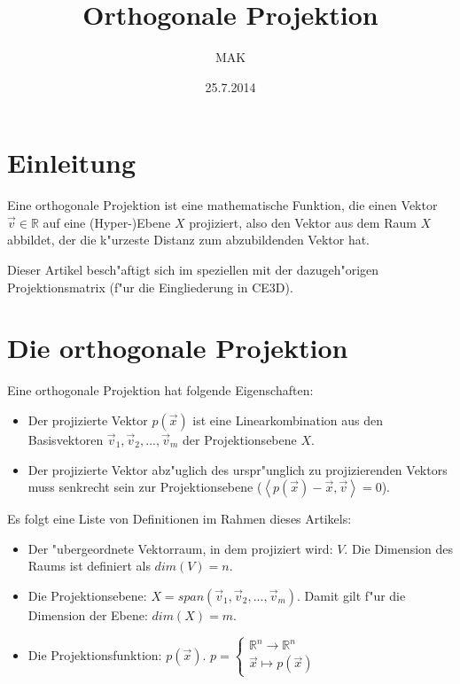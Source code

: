 \documentclass{article}
\newcommand{\lrangle}[1]{\left\langle #1 \right\rangle}
\begin{document}
\title{Orthogonale Projektion}
\author{MAK}
\date{25.7.2014}

\maketitle

\section{Einleitung}

Eine orthogonale Projektion ist eine mathematische Funktion, die einen Vektor
\(\vec{v}\in\mathbb{R}\) auf eine (Hyper-)Ebene \(X\) projiziert, also den
Vektor aus dem Raum \(X\) abbildet, der die k"urzeste Distanz zum abzubildenden
Vektor hat.

Dieser Artikel besch"aftigt sich im speziellen mit der dazugeh"origen
Projektionsmatrix (f"ur die Eingliederung in CE3D).

\section{Die orthogonale Projektion}

Eine orthogonale Projektion hat folgende Eigenschaften:

    \begin{itemize}
        \item Der projizierte Vektor \(p(\vec{x})\) ist eine Linearkombination
              aus den Basisvektoren \(\vec{v}_1,\vec{v}_2,...,\vec{v}_m\) der
              Projektionsebene \(X\).
        \item Der projizierte Vektor abz"uglich des urspr"unglich zu
              projizierenden Vektors muss senkrecht sein zur Projektionsebene
              (\(\lrangle{ p(\vec{x})-\vec{x},\vec{v} } =0\)).
    \end{itemize}

Es folgt eine Liste von Definitionen im Rahmen dieses Artikels:

    \begin{itemize}
        \item Der "ubergeordnete Vektorraum, in dem projiziert wird: \(V\). Die
              Dimension des Raums ist definiert als \(dim(V)=n\).
        \item Die Projektionsebene:
              \(X=span(\vec{v}_1,\vec{v}_2,...,\vec{v}_m)\). Damit gilt f"ur die
              Dimension der Ebene: \(dim(X)=m\).
        \item Die Projektionsfunktion: \(p(\vec{x})\).
              \(p = \left\{\begin{array}{l}\mathbb{R}^n\to \mathbb{R}^n\\\vec{x}
              \mapsto p(\vec{x})\end{array} \right.\)
    \end{itemize}
\end{document}
